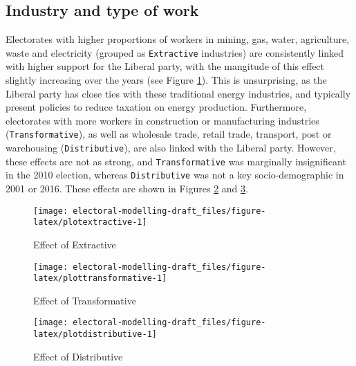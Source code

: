 \documentclass[openany]{book}
\begin{document}
\hypertarget{industry-and-type-of-work}{%
\subsection{Industry and type of work}\label{industry-and-type-of-work}}

Electorates with higher proportions of workers in mining, gas, water, agriculture, waste and electricity (grouped as \texttt{Extractive} industries) are consistently linked with higher support for the Liberal party, with the mangitude of this effect slightly increasing over the years (see Figure \ref{fig:plotextractive}). This is unsurprising, as the Liberal party has close ties with these traditional energy industries, and typically present policies to reduce taxation on energy production. Furthermore, electorates with more workers in construction or manufacturing industries (\texttt{Transformative}), as well as wholesale trade, retail trade, transport, post or warehousing (\texttt{Distributive}), are also linked with the Liberal party. However, these effects are not as strong, and \texttt{Transformative} was marginally insignificant in the 2010 election, whereas \texttt{Distributive} was not a key socio-demographic in 2001 or 2016. These effects are shown in Figures \ref{fig:plottransformative} and \ref{fig:plotdistributive}.

\begin{figure}[h]

{\centering \texttt{[image: electoral-modelling-draft\_files/figure-latex/plotextractive-1]} 

}

\caption{Effect of Extractive}\label{fig:plotextractive}
\end{figure}

\begin{figure}[h]

{\centering \texttt{[image: electoral-modelling-draft\_files/figure-latex/plottransformative-1]} 

}

\caption{Effect of Transformative}\label{fig:plottransformative}
\end{figure}
\begin{figure}[h]

{\centering \texttt{[image: electoral-modelling-draft\_files/figure-latex/plotdistributive-1]} 

}

\caption{Effect of Distributive}\label{fig:plotdistributive}
\end{figure}
\end{document}
